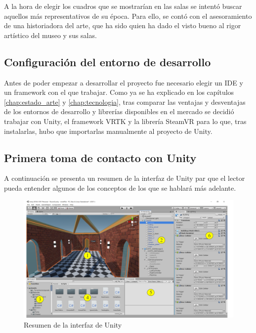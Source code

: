 A la hora de elegir los cuadros que se mostrarían en las salas se intentó buscar aquellos más representativos de su época. Para ello, se contó con el asesoramiento de una historiadora del arte, que ha sido quien ha dado el visto bueno al rigor artístico del museo y sus salas.

\subsection{Configuración del entorno de desarrollo}

Antes de poder empezar a desarrollar el proyecto fue necesario elegir un \acs{IDE} y un framework con el que trabajar. Como ya se ha explicado en los capítulos \ref{chap:estado_arte} y \ref{chap:tecnologia}, tras comparar las ventajas y desventajas de los entornos de desarrollo y librerías disponibles en el mercado se decidió trabajar con Unity, el framework \acs{VRTK} y la librería SteamVR para lo que, tras instalarlas, hubo que importarlas manualmente al proyecto de Unity.

\subsection{Primera toma de contacto con Unity}

A continuación se presenta un resumen de la interfaz de Unity par que el lector pueda entender algunos de los conceptos de los que se hablará más adelante.

\begin{figure}[!h]
\begin{center}
\includegraphics[width=1\textwidth]{imagenes/7/interfaz-unity.png}
\caption{Resumen de la interfaz de Unity}
\label{fig:interfaz-unity}
\end{center}
\end{figure}

